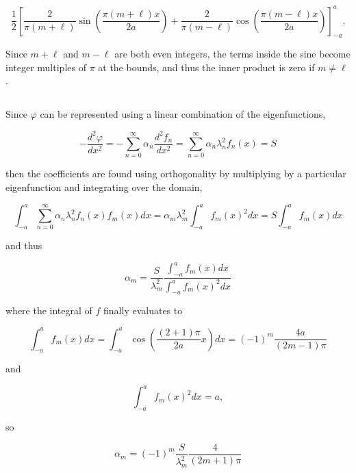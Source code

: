 \documentclass{hw-template}
\begin{document}
\begin{equation}
    \frac{1}{2} \left[ \frac{2}{\pi (m + \ell)}\sin\left(\frac{\pi (m+\ell) x}{2a} \right) + \frac{2}{\pi (m - \ell)} \cos \left(\frac{\pi (m - \ell) x}{2a} \right) \right]_{-a}^a.
\end{equation}

Since $m+\ell$ and $m-\ell$ are both even integers, the terms inside the sine become integer multiples of $\pi$ at the bounds, and thus the inner product is zero if $m\neq \ell$.

\subsection{}

Since $\varphi$ can be represented using a linear combination of the eigenfunctions,

\begin{equation}
    -\frac{d^2\varphi}{dx^2} = -\sum_{n=0}^{\infty}\alpha_n \frac{d^2 f_n}{dx^2} = \sum_{n=0}^{\infty}\alpha_n \lambda_n^2 f_n(x) = S
\end{equation}

then the coefficients are found using orthogonality by multiplying by a particular eigenfunction and integrating over the domain,

\begin{equation}
    \int_{-a}^a \sum_{n=0}^{\infty}\alpha_n \lambda_n^2 f_n(x)f_m(x) dx = \alpha_m\lambda_m^2 \int_{-a}^a  f_m(x)^2 dx  = S\int_{-a}^a f_m(x)dx
\end{equation}

and thus 

\begin{equation}
    \alpha_m = \frac{S}{\lambda_m^2} \frac{\int_{-a}^a f_m(x)dx}{\int_{-a}^a  f_m(x)^2 dx}
\end{equation}

where the integral of $f$ finally evaluates to

\begin{equation}
    \int_{-a}^a f_m(x)dx = \int_{-a}^a \cos \left(\frac{(2+1)\pi}{2a} x \right) dx = (-1)^m\frac{4a}{(2m-1)\pi}
\end{equation}

and 

\begin{equation}
    \int_{-a}^a f_m(x)^2dx = a,
\end{equation}

so

\begin{equation}
    \alpha_m = (-1)^{m}\frac{S}{\lambda_m^2} \frac{4}{(2m+1)\pi}
\end{equation}
\end{document}
